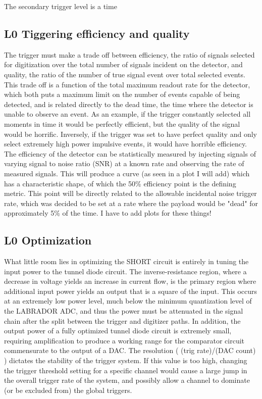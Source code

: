 		The secondary trigger level is a time 
		
		

	\subsection{L0 Tiggering efficiency and quality}
		The trigger must make a trade off between efficiency, the ratio of signals selected for digitization over the total number of signals incident on the detector, and quality, the ratio of the number of true signal event over total selected events.  This trade off is a function of the total maximum readout rate for the detector, which both puts a maximum limit on the number of events capable of being detected, and is related directly to the dead time, the time where the detector is unable to observe an event.  As an example, if the trigger constantly selected all moments in time it would be perfectly efficient, but the quality of the signal would be horrific.  Inversely, if the trigger was set to have perfect quality and only select extremely high power impulsive events, it would have horrible efficiency.  The efficiency of the detector can be statistically measured by injecting signals of varying signal to noise ratio (SNR) at a known rate and observing the rate of measured signals.  This will produce a curve (as seen in a plot I will add) which has a characteristic shape, of which the 50\% efficiency point is the defining metric.  This point will be directly related to the allowable incidental noise trigger rate, which was decided to be set at a rate where the payload would be "dead" for approximately 5\% of the time.  I have to add plots for these things!
		
	\subsection{L0 Optimization}
		What little room lies in optimizing the SHORT circuit is entirely in tuning the input power to the tunnel diode circuit.  The inverse-resistance region, where a decrease in voltage yields an increase in current flow, is the primary region where additional input power yields an output that is a square of the input.  This occurs at an extremely low power level, much below the minimum quantization level of the LABRADOR ADC, and thus the power must be attenuated in the signal chain after the split between the trigger and digitizer paths.  In addition, the output power of a fully optimized tunnel diode circuit is extremely small,	requiring amplification to produce a working range for the comparator circuit commensurate to the output of a DAC.  The resolution ( (trig rate)/(DAC count) ) dictates the stability of the trigger system.  If this value is too high, changing the trigger threshold setting for a specific channel would cause a large jump in the overall trigger rate of the system, and possibly allow a channel to dominate (or be excluded from) the global triggers.
		
